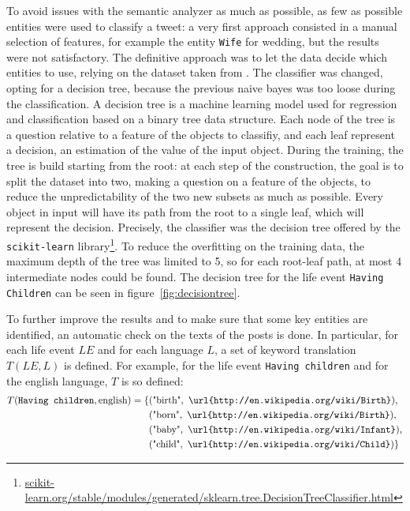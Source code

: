 To avoid issues with the semantic analyzer as much as possible, as few as possible entities were used to classify a tweet: a very first approach consisted in a manual selection of features, for example the entity \texttt{Wife} for wedding, but the results were not satisfactory. The definitive approach was to let the data decide which entities to use, relying on the dataset taken from \cite{dickinson2015identifying}. The classifier was changed, opting for a decision tree, because the previous naive bayes was too loose during the classification. A decision tree is a machine learning model used for regression and classification based on a binary tree data structure. Each node of the tree is a question relative to a feature of the objects to classifiy, and each leaf represent a decision, an estimation of the value of the input object. During the training, the tree is build starting from the root: at each step of the construction, the goal is to split the dataset into two, making a question on a feature of the objects, to reduce the unpredictability of the two new subsets as much as possible. Every object in input will have its path from the root to a single leaf, which will represent the decision. Precisely, the classifier was the decision tree offered by the \texttt{scikit-learn} library\footnote{\url{scikit-learn.org/stable/modules/generated/sklearn.tree.DecisionTreeClassifier.html}}. To reduce the overfitting on the training data, the maximum depth of the tree was limited to 5, so for each root-leaf path, at most 4 intermediate nodes could be found. The decision tree for the life event \texttt{Having Children} can be seen in figure~\ref{fig:decisiontree}.

To further improve the results and to make sure that some key entities are identified, an automatic check on the texts of the posts is done. In particular, for each life event $LE$ and for each language $L$, a set of keyword translation $T(LE, L)$ is defined. For example, for the life event \texttt{Having children} and for the english language, $T$ is so defined:
\begin{equation*}
\begin{split}
T(\text{\texttt{Having children}}, \text{english}) = \{&(\text{"birth"}, \text{ \texttt{\url{http://en.wikipedia.org/wiki/Birth}}}),\\&(\text{"born"}, \text{ \texttt{\url{http://en.wikipedia.org/wiki/Birth}}}),\\&(\text{"baby"}, \text{ \texttt{\url{http://en.wikipedia.org/wiki/Infant}}}),\\&(\text{"child"}, \text{ \texttt{\url{http://en.wikipedia.org/wiki/Child}}})\}
\end{split}
\end{equation*}

